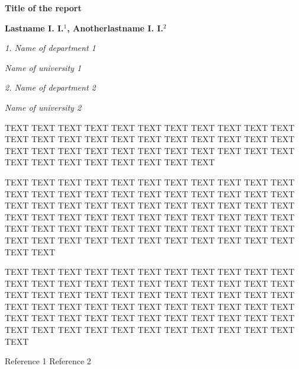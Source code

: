 \documentclass[12pt]{article}
\begin{document}
\begin{center}
	{\large\bf Title of the report}
\end{center}  
\medskip
\begin{center}
	{\bf Lastname I. I.$^1$, Anotherlastname I. I.$^2$}   
\end{center}
\medskip
\begin{center}
	{\it 1. Name of department 1}   
\end{center}

\begin{center}
	{\it Name of university 1}  
\end{center}
\medskip
\begin{center}
	{\it 2. Name of department 2}   
\end{center}

\begin{center}
	{\it Name of university 2}  
\end{center}	
\bigskip


TEXT TEXT TEXT TEXT TEXT TEXT TEXT TEXT TEXT TEXT TEXT TEXT
TEXT TEXT TEXT TEXT TEXT TEXT TEXT TEXT TEXT TEXT TEXT TEXT
TEXT TEXT TEXT TEXT TEXT TEXT TEXT TEXT TEXT TEXT TEXT TEXT
TEXT TEXT TEXT TEXT TEXT \cite{1}  

TEXT TEXT TEXT TEXT TEXT
TEXT TEXT TEXT TEXT TEXT TEXT TEXT TEXT TEXT TEXT TEXT TEXT
TEXT TEXT TEXT TEXT TEXT TEXT TEXT TEXT TEXT TEXT TEXT TEXT
TEXT TEXT TEXT TEXT TEXT TEXT TEXT TEXT TEXT TEXT TEXT TEXT
TEXT TEXT TEXT TEXT TEXT TEXT TEXT TEXT TEXT TEXT TEXT TEXT
TEXT TEXT TEXT TEXT TEXT TEXT TEXT TEXT TEXT TEXT TEXT TEXT
TEXT TEXT TEXT \cite{2}  

TEXT TEXT TEXT TEXT TEXT TEXT TEXT
TEXT TEXT TEXT TEXT TEXT TEXT TEXT TEXT TEXT TEXT TEXT TEXT
TEXT TEXT TEXT TEXT TEXT TEXT TEXT TEXT TEXT TEXT TEXT TEXT
TEXT TEXT TEXT TEXT TEXT TEXT TEXT TEXT TEXT TEXT TEXT TEXT
TEXT TEXT TEXT TEXT TEXT TEXT TEXT TEXT TEXT TEXT TEXT TEXT
TEXT TEXT TEXT TEXT TEXT TEXT TEXT TEXT TEXT TEXT TEXT TEXT


\begin{thebibliography}{99}
	 Reference 1
	 Reference 2
\end{thebibliography}
\end{document}
